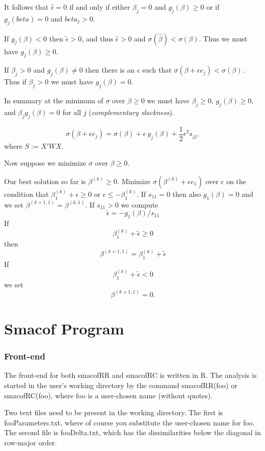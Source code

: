 \documentclass[
  12pt,
]{article}
\begin{document}
It follows that \(\hat\epsilon=0\) if and only if either \(\beta_j=0\) and
\(g_j(\beta)\geq 0\) or if \(g_j(beta)=0\) and \(beta_j>0\).

If \(g_j(\beta)<0\) then \(\tilde\epsilon>0\), and thus \(\hat\epsilon>0\) and
\(\sigma(\hat\beta)<\sigma(\beta)\). Thus we must have \(g_j(\beta)\geq 0\).

If \(\beta_j>0\) and \(g_j(\beta)\not=0\) then there is an \(\epsilon\) such
that \(\sigma(\beta+\epsilon e_j)<\sigma(\beta)\). Thus if \(\beta_j>0\) we
must have \(g_j(\beta)=0\).

In summary at the minimum of \(\sigma\) over \(\beta\geq 0\) we must have
\(\beta_j\geq 0\), \(g_j(\beta)\geq 0\), and \(\beta_jg_j(\beta)=0\) for all
\(j\) (\emph{complementary slackness}).

\[
\sigma(\beta+\epsilon e_j)=\sigma(\beta)+\epsilon\ g_j(\beta)+\frac12\epsilon^2s_{jj},
\] where \(S:=X'WX\).

Now suppose we minimize \(\sigma\) over \(\beta\geq 0\).

Our best solution so far is \(\beta^{(k)}\geq 0\). Minimize
\(\sigma(\beta^{(k)}+\epsilon e_1)\) over \(\epsilon\) on the condition that
\(\beta^{(k)}_1+\epsilon\geq 0\) or \(\epsilon\leq-\beta^{(k)}_1\). If
\(s_{11}=0\) then also \(g_1(\beta)=0\) and we set
\(\beta^{(k+1,1)}=\beta^{(k,1)}\). If \(s_{11}>0\) we compute \[
\tilde\epsilon=-g_1(\beta)/s_{11}
\] If \[
\beta^{(k)}_1+\tilde\epsilon\geq 0
\] then \[
\beta^{(k+1,1)}=\beta^{(k)}_1+\tilde\epsilon
\] If \[
\beta^{(k)}_1+\tilde\epsilon<0
\] we set \[
\beta^{(k+1,1)}=0.
\]

\section{Smacof Program}\label{smacof-program}

\subsubsection{Front-end}\label{front-end}

The front-end for both smacofRR and smacofRC is written in R. The
analysis is started in the user's working directory by the command
smacofRR(foo) or smacofRC(foo), where foo is a user-chosen name (without
quotes).

Two text files need to be present in the working directory. The first is
fooParameters.txt, where of course you substitute the user-chosen name
for foo. The second file is fooDelta.txt, which has the dissimilarities
below the diagonal in row-major order.
\end{document}
